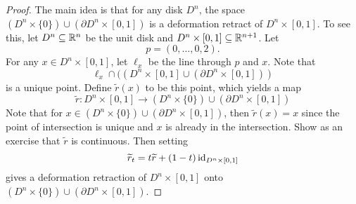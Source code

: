 \begin{proof}
  The main idea is that for any disk $D^n$, the space
  $(D^n \times \{0\}) \cup (\partial D^n \times [0, 1])$
  is a deformation retract of $D^n \times [0, 1]$.
  To see this, let $D^n \subseteq \mathbb{R}^n$ be the unit
  disk and $D^n \times [0, 1] \subseteq \mathbb{R}^{n + 1}$.
  Let
  \[
    p = (0, \dots, 0, 2).
  \]
  For any $x \in D^n \times [0, 1]$, let
  $\ell_x$ be the line through $p$ and $x$. Note that
  \[
    \ell_x \cap ((D^n \times [0, 1] \cup (\partial D^n \times [0, 1]))
  \]
  is a unique point. Define $\widetilde{r}(x)$ to be this point,
  which yields a map
  \[\widetilde{r} : D^n \times [0, 1] \to (D^n \times \{0\}) \cup (\partial D^n \times [0, 1])\]
  Note that for $x \in (D^n \times \{0\}) \cup (\partial D^n \times [0, 1])$,
  then $\widetilde{r}(x) = x$ since the point of intersection is
  unique and $x$ is already in the intersection.
  Show as an exercise that $\widetilde{r}$ is continuous.
  Then setting
  \[
    \widetilde{r}_t = t \widetilde{r} + (1 - t) \operatorname{id}_{D^n \times [0, 1]}
  \]
  gives a deformation retraction
  of $D^n \times [0, 1]$ onto
  $(D^n \times \{0\}) \cup (\partial D^n \times [0, 1])$.


\end{proof}
